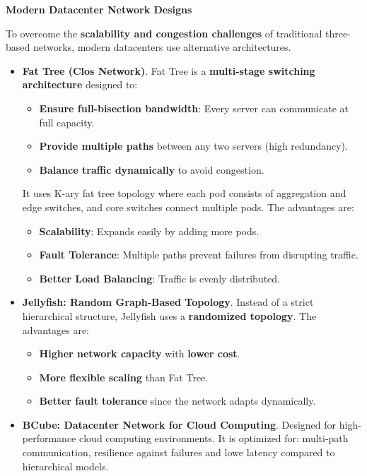 \highspace
\begin{flushleft}
    \textcolor{Green3}{ \textbf{Modern Datacenter Network Designs}}
\end{flushleft}
To overcome the \textbf{scalability and congestion challenges} of traditional three-based networks, modern datacenters use alternative architectures.
\begin{itemize}[label=\textcolor{Green3}{}]
    \item \textcolor{Green3}{\textbf{Fat Tree (Clos Network)}}. Fat Tree is a \textbf{multi-stage switching architecture} designed to:
    \begin{itemize}
        \item \textbf{Ensure full-bisection bandwidth}: Every server can communicate at full capacity.
        \item \textbf{Provide multiple paths} between any two servers (high redundancy).
        \item \textbf{Balance traffic dynamically} to avoid congestion.
    \end{itemize}
    It uses K-ary fat tree topology where each pod consists of aggregation and edge switches, and core switches connect multiple pods. The advantages are:
    \begin{itemize}
        \item \textbf{Scalability}: Expands easily by adding more pods.
        \item \textbf{Fault Tolerance}: Multiple paths prevent failures from disrupting traffic.
        \item \textbf{Better Load Balancing}: Traffic is evenly distributed.
    \end{itemize}

    \item \textcolor{Green3}{\textbf{Jellyfish: Random Graph-Based Topology}}. Instead of a strict hierarchical structure, Jellyfish uses a \textbf{randomized topology}. The advantages are:
    \begin{itemize}
        \item \textbf{Higher network capacity} with \textbf{lower cost}.
        \item \textbf{More flexible scaling} than Fat Tree.
        \item \textbf{Better fault tolerance} since the network adapts dynamically.
    \end{itemize}
    
    \item \textcolor{Green3}{\textbf{BCube: Datacenter Network for Cloud Computing}}. Designed for high-performance cloud computing environments. It is optimized for: multi-path communication, resilience against failures and lowe latency compared to hierarchical models.
\end{itemize}


